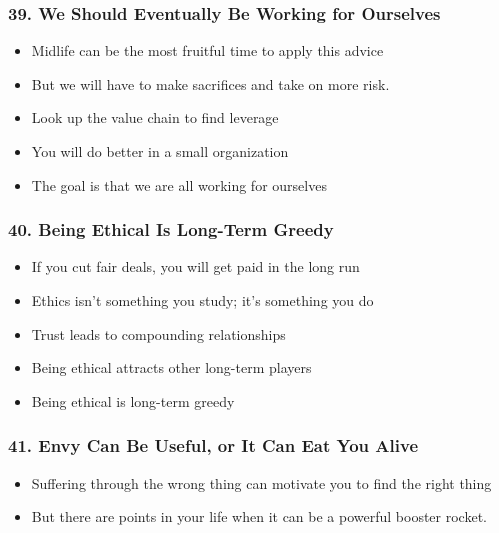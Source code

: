 \begin{frame}[fragile]
\frametitle{39. We Should Eventually Be Working for Ourselves}
\begin{itemize}
\item Midlife can be the most fruitful time to apply this advice
\item But we will have to make sacrifices and take on more risk.
\item Look up the value chain to find leverage
\item You will do better in a small organization
\item The goal is that we are all working for ourselves
\end{itemize}
\end{frame}

\begin{frame}[fragile]
\frametitle{40. Being Ethical Is Long-Term Greedy}
\begin{itemize}
\item If you cut fair deals, you will get paid in the long run
\item Ethics isn't something you study; it's something you do
\item Trust leads to compounding relationships
\item Being ethical attracts other long-term players
\item Being ethical is long-term greedy
\end{itemize}
\end{frame}

\begin{frame}[fragile]
\frametitle{41. Envy Can Be Useful, or It Can Eat You Alive}
\begin{itemize}
\item Suffering through the wrong thing can motivate you to  find the right thing
\item But there are points in your life when it can be a powerful booster rocket.
\end{itemize}
\end{frame}

